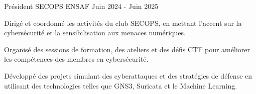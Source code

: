 
\begin{cventries}

  \cventry
  {Président} %
  {SECOPS} %
  {ENSAF} %
  {Juin 2024 - Juin 2025} %
  {
    \begin{cvitems} %
      \item {Dirigé et coordonné les activités du club SECOPS, en mettant l'accent sur la cybersécurité et la sensibilisation aux menaces numériques.}
      \item {Organisé des sessions de formation, des ateliers et des défis CTF pour améliorer les compétences des membres en cybersécurité.}
      \item {Développé des projets simulant des cyberattaques et des stratégies de défense en utilisant des technologies telles que GNS3, Suricata et le Machine Learning.}
    \end{cvitems}
  }

\end{cventries}
